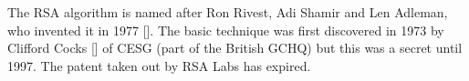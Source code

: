 The RSA algorithm is named after Ron Rivest, Adi Shamir and Len Adleman, who invented it in 1977 [\cite{rivest1978method}].
The basic technique was first discovered in 1973 by Clifford Cocks [\cite{cocks1973note}] of CESG (part of the British GCHQ)
but this was a secret until 1997.
The patent taken out by RSA Labs has expired.

